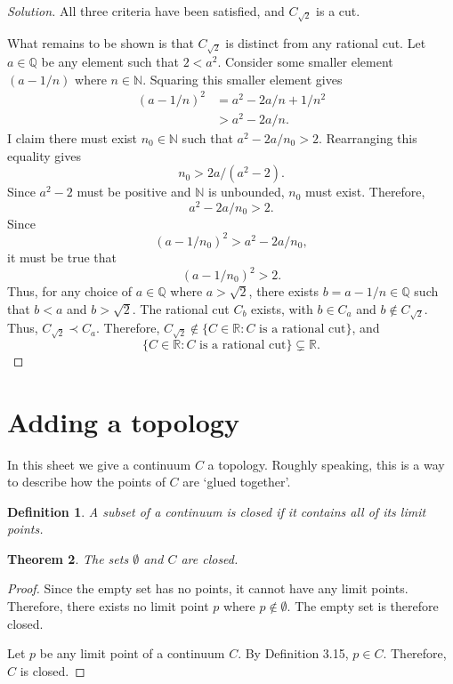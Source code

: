 \documentclass{amsart}
\newtheorem{theorem}{Theorem}
\newtheorem{definition}[theorem]{Definition}
\newcommand{\N}{\mathbb N}
\newcommand{\Q}{\mathbb Q}
\newcommand{\R}{\mathbb R}
\newcommand{\1}{\mathds{1}}
\def \R {{\mathbb {R}}}
\def \N {{\mathbb {N}}}
\numberwithin{equation}{section}
\numberwithin{theorem}{section}
\begin{document}
\begin{proof}[Solution]
	All three criteria have been satisfied, and $C_{\sqrt{2}}$ is a cut. 
	
	What remains to be shown is that $C_{\sqrt{2}}$ is distinct from any rational cut. Let $a\in\Q$ be any element such that $2<a^2$. Consider some smaller element $(a-1/n)$ where $n\in\N$. Squaring this smaller element gives
	\[\begin{split}
		(a-1/n)^2 &= a^2 - 2a/n + 1/n^2\\
		&>a^2 - 2a/n.
	\end{split}\]
	I claim there must exist $n_0\in\N$ such that $a^2 - 2a/n_0 > 2$. Rearranging this equality gives $$n_0 > 2a/(a^2-2).$$ Since $a^2-2$ must be positive and $\N$ is unbounded, $n_0$ must exist. Therefore, $$a^2 - 2a/n_0 > 2.$$ Since $$(a-1/n_0)^2 > a^2 - 2a/n_0,$$ it must be true that $$(a-1/n_0)^2 > 2.$$ Thus, for any choice of $a\in\Q$ where $a>\sqrt{2}$, there exists $b = a-1/n\in\Q$ such that $b<a$ and $b>\sqrt{2}$. The rational cut $C_b$ exists, with $b\in C_a$ and $b\notin C_{\sqrt{2}}$. Thus, $C_{\sqrt{2}} \prec C_a$. Therefore, $C_{\sqrt{2}} \notin \{C\in\R: C \text{ is a rational cut}\}$, and $$\{C\in\R: C \text{ is a rational cut}\}\subsetneq \R.$$ 
	
\end{proof}






\bigskip \section{Adding a topology}

In this sheet we give a continuum $C$ a topology.  Roughly speaking, this is a way to describe how the points of $C$ are `glued together'.  

\medskip




\begin{definition}
A subset of a continuum is \emph{closed} if it contains all of its limit points.
\end{definition}

\begin{theorem}  The sets $\emptyset$ and $C$ are closed.
\end{theorem}

\begin{proof}
	Since the empty set has no points, it cannot have any limit points. Therefore, there exists no limit point $p$ where $p\notin\emptyset$. The empty set is therefore closed.
	
	Let $p$ be any limit point of a continuum $C$. By Definition 3.15, $p\in C$. Therefore, $C$ is closed.
\end{proof}
\end{document}
